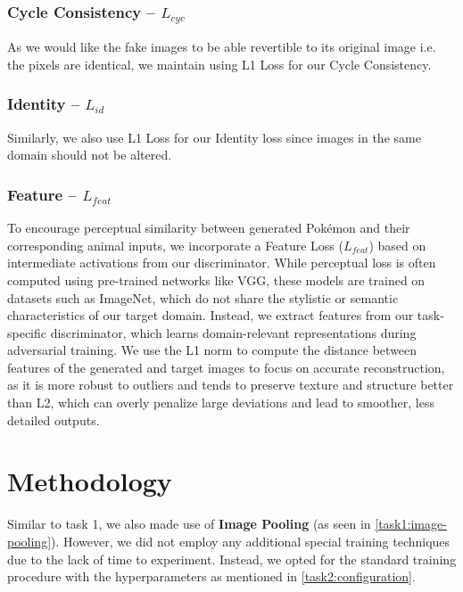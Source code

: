 \documentclass[twoside,english,notitlepage]{report}
\begin{document}
\subsubsection{Cycle Consistency – $L_{cyc}$}
As we would like the fake images to be able revertible to its original image i.e. the pixels are identical, we maintain using L1 Loss for our Cycle Consistency.

\subsubsection{Identity – $L_{id}$}
Similarly, we also use L1 Loss for our Identity loss since images in the same domain should not be altered. 
\subsubsection{Feature – $L_{feat}$}
To encourage perceptual similarity between generated Pokémon and their corresponding animal inputs, we incorporate a Feature Loss ($L_{feat}$) based on intermediate activations from our discriminator. While perceptual loss is often computed using pre-trained networks like VGG, these models are trained on datasets such as ImageNet, which do not share the stylistic or semantic characteristics of our target domain. Instead, we extract features from our task-specific discriminator, which learns domain-relevant representations during adversarial training. We use the L1 norm to compute the distance between features of the generated and target images to focus on accurate reconstruction, as it is more robust to outliers and tends to preserve texture and structure better than L2, which can overly penalize large deviations and lead to smoother, less detailed outputs.

\section{Methodology}
Similar to task 1, we also made use of \textbf{Image Pooling} (as seen in \ref{task1:image-pooling}). However, we did not employ any additional special training techniques due to the lack of time to experiment. Instead, we opted for the standard training procedure with the hyperparameters as mentioned in \ref{task2:configuration}.
\end{document}
